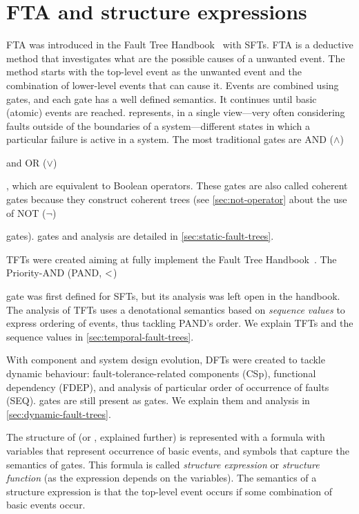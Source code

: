 \documentclass[en,twoside,onehalfspacing,phd]{risethesis}
\def\FThandbook{Fault Tree Handbook~\cite{VGR+1981}\index{Fault Tree!Handbook}%
  \gdef\FThandbook{Fault Tree Handbook\index{Fault Tree!Handbook}\xspace}%
  \xspace}
\def\ortext{OR ($\lor$)%
  \gdef\ortext{OR\xspace}%
  \xspace
}
\def\andtext{AND ($\land$)%
  \gdef\andtext{AND\xspace}%
  \xspace
}
\def\pandtext{Priority-AND (PAND, $\pand$)%
  \gdef\pandtext{PAND\xspace}%
  \xspace
}
\def\nottext{NOT ($\lnot$)%
  \gdef\nottext{NOT\xspace}%
  \xspace
}
\def\pand{\ensuremath\operatorname{<}}
\begin{document}
\section{\Acl{FTA} and structure expressions}
\label{sec:fault-trees}

\Ac{FTA} was introduced in the \FThandbook with \aclp{SFT}.
\Ac{FTA} is a deductive method that investigates what are the possible causes of a unwanted event.
The method starts with the top-level event as the unwanted event and the combination of lower-level events that can cause it.
Events are combined using gates, and each gate has a well defined semantics.
It continues until basic (atomic) events are reached.
 represents, in a single view---very often considering faults outside of the boundaries of a system---different states in which a particular failure is active in a system.
The most traditional gates are \andtext and \ortext, which are equivalent to Boolean operators.
These gates are also called coherent gates because they construct coherent trees (see \cref{sec:not-operator} about the use of \nottext gates).
 gates and analysis are detailed in \cref{sec:static-fault-trees}.

\Acp{TFT} were created aiming at fully implement the \FThandbook~\cite{VGR+1981}.
The \pandtext gate was first defined for \acp{SFT}, but its analysis was left open in the handbook.
The analysis of \acp{TFT} uses a denotational semantics based on \emph{sequence values} to express ordering of events, thus tackling \pandtext's order.
We explain \acp{TFT} and the sequence values in \cref{sec:temporal-fault-trees}.

With component and system design evolution, \acp{DFT} were created to tackle dynamic behaviour: fault-tolerance-related components (\ac{CSp}), functional dependency (\ac{FDEP}), and analysis of particular order of occurrence of faults (\ac{SEQ}).
 gates are still present as  gates.
We explain them and  analysis in \cref{sec:dynamic-fault-trees}.

The structure of  (or , explained further) is represented with a formula with variables that represent occurrence of basic events, and symbols that capture the semantics of gates.
This formula is called \emph{structure expression} or \emph{structure function} (as the expression depends on the variables).
The semantics of a structure expression is that the top-level event occurs if some combination of basic events occur.
\end{document}
